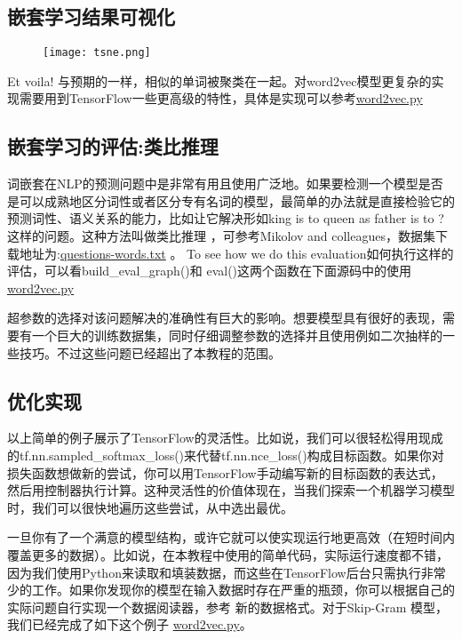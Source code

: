 \subsection{嵌套学习结果可视化}
\begin{center}
\begin{figure}[H]
\texttt{[image: tsne.png]}
\end{figure}
\end{center}
Et voila! 与预期的一样，相似的单词被聚类在一起。对word2vec模型更复杂的实现需要用到TensorFlow一些更高级的特性，具体是实现可以参考\href{https://github.com/bleedingfight/models/tree/master/tutorials/embedding}{word2vec.py}
\subsection{嵌套学习的评估:类比推理}
词嵌套在NLP的预测问题中是非常有用且使用广泛地。如果要检测一个模型是否是可以成熟地区分词性或者区分专有名词的模型，最简单的办法就是直接检验它的预测词性、语义关系的能力，比如让它解决形如king is to queen as father is to ?这样的问题。这种方法叫做类比推理 ，可参考Mikolov and colleagues，数据集下载地址为:\href{https://word2vec.googlecode.com/svn/trunk/questions-words.txt}{questions-words.txt} 。
To see how we do this evaluation如何执行这样的评估，可以看build\_eval\_graph()和 eval()这两个函数在下面源码中的使用 \href{https://github.com/bleedingfight/models/tree/master/tutorials/embedding}{word2vec.py}

超参数的选择对该问题解决的准确性有巨大的影响。想要模型具有很好的表现，需要有一个巨大的训练数据集，同时仔细调整参数的选择并且使用例如二次抽样的一些技巧。不过这些问题已经超出了本教程的范围。
\subsection{优化实现}
以上简单的例子展示了TensorFlow的灵活性。比如说，我们可以很轻松得用现成的tf.nn.sampled\_softmax\_loss()来代替tf.nn.nce\_loss()构成目标函数。如果你对损失函数想做新的尝试，你可以用TensorFlow手动编写新的目标函数的表达式，然后用控制器执行计算。这种灵活性的价值体现在，当我们探索一个机器学习模型时，我们可以很快地遍历这些尝试，从中选出最优。

一旦你有了一个满意的模型结构，或许它就可以使实现运行地更高效（在短时间内覆盖更多的数据）。比如说，在本教程中使用的简单代码，实际运行速度都不错，因为我们使用Python来读取和填装数据，而这些在TensorFlow后台只需执行非常少的工作。如果你发现你的模型在输入数据时存在严重的瓶颈，你可以根据自己的实际问题自行实现一个数据阅读器，参考 新的数据格式。对于Skip-Gram 模型，我们已经完成了如下这个例子 \href{https://github.com/bleedingfight/models/tree/master/tutorials/embedding}{word2vec.py}。

